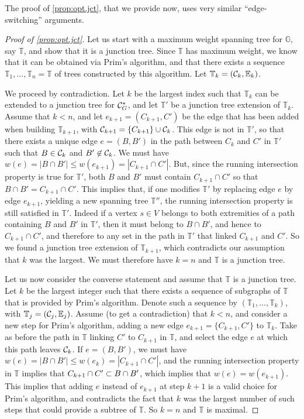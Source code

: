The proof of  \cref{prop:opt.jct}, that we provide now, uses
very similar ``edge-switching'' arguments.
\begin{proof}[Proof of  \cref{prop:opt.jct}]

Let us start with a maximum weight spanning tree for $\mathbb G$, say $\mathbb T$, and
show that it is a
junction tree. Since $\mathbb T$ has maximum weight, we know that it can be
obtained via Prim's algorithm, and that there exists a sequence
$\mathbb T_1,
\ldots, \mathbb T_n=\mathbb T$ of trees constructed by this
algorithm. Let $\mathbb T_k = ({\mathcal C}_k, \mathbb E_k)$.  

We proceed by contradiction.
Let $k$ be the largest index such that $\mathbb
T_k$ can
be extended to a junction tree for ${\mathcal C}_G^*$, and let $\mathbb T'$ be a junction tree
extension of $\mathbb T_{k}$. Assume that $k<n$, and let $e_{k+1} = (C_{k+1}, C')$ be the edge
that has been added when building $\mathbb T_{k+1}$, with ${\mathcal C}_{k+1} =
\{C_{k+1}\}\cup {\mathcal C}_{k}$. This edge is not
in $\mathbb T'$, so that there  exists a unique edge $e = (B,B')$ in the path
between $C_k$ and $C'$ in $\mathbb T'$  such that $B\in {\mathcal C}_{k}$ and
$B'\not\in {\mathcal C}_{k}$. We must have $w(e) = |B\cap B'| \leq w(e_{k+1}) =
|C_{k+1} \cap C'|$. But, since the running intersection property is true
for $\mathbb T'$, both $B$ and $B'$ must contain $C_{k+1}\cap C'$ so that
$B\cap B' = C_{k+1}\cap C'$. This implies that, if one modifies $\mathbb
T'$ by replacing edge $e$ by edge $e_{k+1}$, yielding a new spanning tree
$\mathbb T''$, the running intersection property is still satisfied in
$\mathbb T'$. Indeed if a vertex $s\in V$ belongs to both extremities
of a path containing $B$ and $B'$ in $\mathbb T'$, then it must belong
to $B\cap B'$, and hence to $C_{k+1}\cap C'$, and therefore to any set in
the path in $\mathbb T'$ that linked $C_{k+1}$ and $C'$.  So we found
a junction tree extension of $\mathbb T_{k+1}$, which contradicts our
assumption that $k$ was the largest. We must therefore have $k=n$ and $\mathbb
T$ is a junction tree.

Let us now consider the converse statement and assume that $\mathbb T$
is a junction tree. Let $k$ be the largest integer such that there
exists a sequence of subgraphs of $\mathbb T$ that is provided by
Prim's algorithm. Denote such a sequence by $(\mathbb T_1, \ldots,
\mathbb T_k)$, with $\mathbb T_j = ({\mathcal C}_j, \mathbb E_j)$. Assume (to
get a contradiction) that $k<n$, and consider a new step for Prim's
algorithm, adding a new edge $e_{k+1} = \{C_{k+1}, C'\}$ to $\mathbb
T_k$. Take as before the path in $\mathbb T$ linking $C'$ to $C_{k+1}$ in $\mathbb
T$, and select the edge $e$ at which this path leaves ${\mathcal C}_k$. If $e =
(B, B')$, we must have $w(e) = |B\cap B'| \leq w(e_k) = |C_{k+1} \cap
C'|$, and the running intersection property in $\mathbb T$ implies
that $C_{k+1}\cap C' \subset B\cap B'$, which implies that $w(e)
=w(e_{k+1})$. This implies that adding $e$ instead of $e_{k+1}$ at
step $k+1$ is a valid choice for Prim's algorithm, and contradicts the
fact that $k$ was the largest number of such steps that could provide
a subtree of $\mathbb T$. So $k=n$ and $\mathbb T$ is maximal.
\end{proof}

